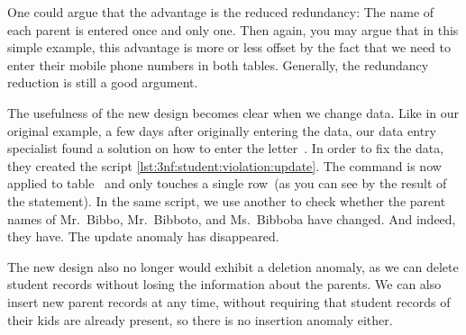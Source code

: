 One could argue that the advantage is the reduced redundancy:
The name of each parent is entered once and only one.
Then again, you may argue that in this simple example, this advantage is more or less offset by the fact that we need to enter their mobile phone numbers in both tables.
Generally, the redundancy reduction is still a good argument.

The usefulness of the new design becomes clear when we change data.
Like in our original example, a few days after originally entering the data, our data entry specialist found a solution on how to enter the letter~.
In order to fix the data, they created the script \cref{lst:3nf:student:violation:update}.
The  command is now applied to table~ and only touches a single row~(as you can see by the result of the  statement).
In the same script, we use another  to check whether the parent names of Mr.~Bibbo, Mr.~Bibboto, and Ms.~Bibboba have changed.
And indeed, they have.
The update anomaly has disappeared.

The new design also no longer would exhibit a deletion anomaly, as we can delete student records without losing the information about the parents.
We can also insert new parent records at any time, without requiring that student records of their kids are already present, so there is no insertion anomaly either.%
%
\FloatBarrier%
\endhsection%
%

